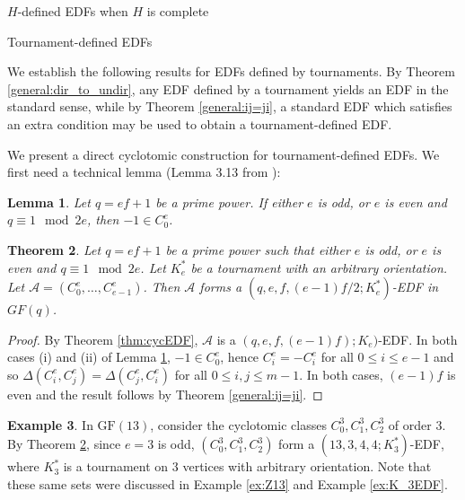 \documentclass[12pt, a4paper]{article}
\newtheorem{theorem}{Theorem}[section]
\newtheorem{lemma}[theorem]{Lemma}
\theoremstyle{definition}
\newtheorem{example}[theorem]{Example}
\begin{document}
\begin{section}{$H$-defined EDFs when $H$ is complete}
\begin{subsection}{Tournament-defined EDFs}

We establish the following results for EDFs defined by tournaments. By Theorem \ref{general:dir_to_undir}, any EDF defined by a tournament yields an EDF in the standard sense, while by Theorem \ref{general:ij=ji}, a standard EDF which satisfies an extra condition may be used to obtain a tournament-defined EDF.

We present a direct cyclotomic construction for tournament-defined EDFs.  We first need a technical lemma (Lemma 3.13 from \cite{HucJoh}):

\begin{lemma}\label{lem:SophieLaura}
Let $q=ef+1$ be a prime power.  If either $e$ is odd, or $e$ is even and $q \equiv 1 \mod 2e$, then $-1 \in C_0^e$.
\end{lemma}


\begin{theorem}\label{thm:cyc_tournament}
Let $q=ef+1$ be a prime power such that either $e$ is odd, or $e$ is even and $q \equiv 1 \mod 2e$.
Let $K_e^*$ be a tournament with an arbitrary orientation.  Let $\mathcal{A}=(C_0^e, \ldots, C_{e-1}^e)$.
Then $\mathcal{A}$ forms a $(q,e,f,(e-1)f/2; K_e^*)$-EDF in $GF(q)$.
\end{theorem}
\begin{proof}
By Theorem \ref{thm:cycEDF}, $\mathcal{A}$ is a $(q,e,f,(e-1)f); K_e)$-EDF.  In both cases (i) and (ii) of Lemma \ref{lem:SophieLaura},  $-1 \in C_0^e$, hence $C_i^e=-C_i^e$ for all $0 \leq i \leq e-1$ and so $\Delta(C_i^e,C_j^e)=\Delta(C_j^e,C_i^e)$ for all $0 \leq i,j \leq m-1$. In both cases, $(e-1)f$ is even and the result follows by  Theorem \ref{general:ij=ji}.
\end{proof}

\begin{example}
In $\mathrm{GF}(13)$, consider the cyclotomic classes $C_0^3,C_1^3,C_2^3$ of order $3$. By Theorem \ref{thm:cyc_tournament}, since $e=3$ is odd, $(C_0^3,C_1^3,C_2^3)$ form a $(13,3,4,4; K_3^*)$-EDF, where $K_3^*$ is a tournament on $3$ vertices with arbitrary orientation.  Note that these same sets were discussed in Example \ref{ex:Z13} and Example \ref{ex:K_3EDF}.   
\end{example}

\end{subsection}

\end{section}
\end{document}
